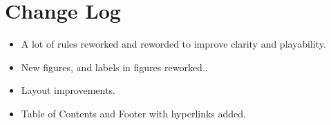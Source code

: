 \part*{Change Log}
\label{change_log}

\begin{itemize}
\item A lot of rules reworked and reworded to improve clarity and playability.
\item New figures, and labels in figures reworked..
\item Layout improvements.
\item Table of Contents and Footer with hyperlinks added.
\end{itemize}
